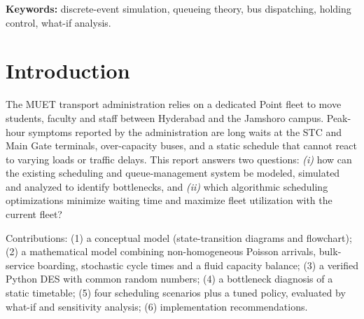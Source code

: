 \documentclass[10pt,twocolumn,letterpaper]{article}
\begin{document}
\begin{abstract}
Mehran University's Point buses carry thousands of students daily between Hyderabad and Jamshoro, yet
students queue for long periods at the STC and Main Gate terminals during the 08:00--09:00 and
14:00--15:30 peaks. We build a discrete-event simulation (DES) of the two-terminal bus loop,
with non-homogeneous Poisson passenger arrivals, stochastic trip times and a fixed fleet of 40 buses, and use it to
diagnose the bottleneck and to test dispatch strategies \emph{without purchasing buses}. A static
timetable with a 2.5\,min peak headway (the assumed baseline) yields a mean wait of \SZeromorMean\,min
(morning) and \SZeroaftMean\,min (afternoon) with 95th-percentile waits of \SZeromorPnf--\SZeroaftPnf\,min, because its
capacity ($\approx$20 pax/min) is below peak demand ($\approx$25 pax/min) while about half the fleet sits idle in terminal
lines. A simple demand-responsive ``full-load-or-short-hold'' dispatch rule, tuned by simulation-based grid search,
cuts the mean wait by \SFourmorRed\% and \SFouraftRed\%, and matches the baseline's mean wait with
only \eqSFour{} buses instead of 40 (30 replications, common random numbers, 95\% CIs). \emph{All demand and trip-time inputs are
assumptions, not MUET measurements}; the framework is built to be re-calibrated with field data.
\end{abstract}

\noindent\textbf{Keywords:} discrete-event simulation, queueing theory, bus dispatching, holding control, what-if analysis.

\section{Introduction}
The MUET transport administration relies on a dedicated Point fleet to move students, faculty and staff
between Hyderabad and the Jamshoro campus. Peak-hour symptoms reported by the administration are long waits at the STC and
Main Gate terminals, over-capacity buses, and a static schedule that cannot react to varying loads or traffic delays. This
report answers two questions: \emph{(i)} how can the existing scheduling and queue-management system be modeled, simulated and
analyzed to identify bottlenecks, and \emph{(ii)} which algorithmic scheduling optimizations minimize waiting time and maximize
fleet utilization with the current fleet?

Contributions: (1) a conceptual model (state-transition diagrams and flowchart); (2) a mathematical model combining
non-homogeneous Poisson arrivals, bulk-service boarding, stochastic cycle times and a fluid capacity balance; (3) a verified
Python DES with common random numbers; (4) a bottleneck diagnosis of a static timetable; (5) four scheduling scenarios plus a
tuned policy, evaluated by what-if and sensitivity analysis; (6) implementation recommendations.
\end{document}
